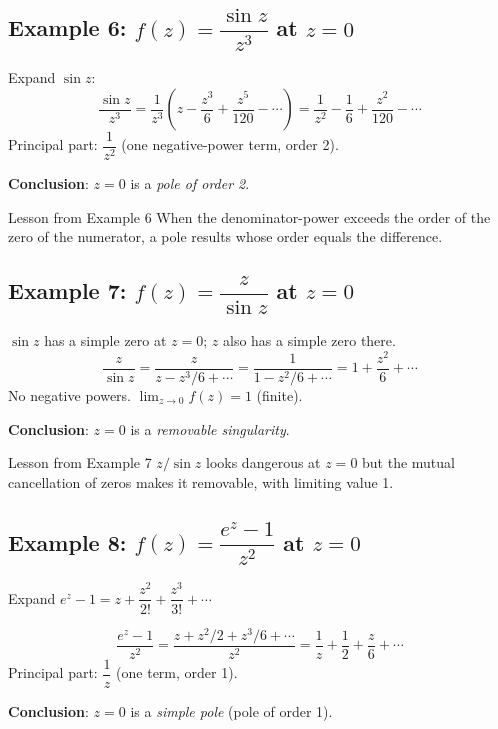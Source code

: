 \documentclass[12pt,a4paper]{article}
\begin{document}
\subsection*{Example 6: $f(z) = \dfrac{\sin z}{z^3}$ at $z = 0$}

Expand $\sin z$:
\[
  \frac{\sin z}{z^3} = \frac{1}{z^3}\!\left(z - \frac{z^3}{6} + \frac{z^5}{120} - \cdots\right)
  = \frac{1}{z^2} - \frac{1}{6} + \frac{z^2}{120} - \cdots
\]
Principal part: $\dfrac{1}{z^2}$ (one negative-power term, order 2).

\textbf{Conclusion}: $z = 0$ is a \emph{pole of order 2}.

\begin{learnbox}{Lesson from Example 6}
When the denominator-power exceeds the order of the zero of the numerator, a pole results whose
order equals the difference.
\end{learnbox}

\subsection*{Example 7: $f(z) = \dfrac{z}{\sin z}$ at $z = 0$}

$\sin z$ has a simple zero at $z = 0$; $z$ also has a simple zero there.
\[
  \frac{z}{\sin z} = \frac{z}{z - z^3/6 + \cdots} = \frac{1}{1 - z^2/6 + \cdots}
  = 1 + \frac{z^2}{6} + \cdots
\]
No negative powers.
$\lim_{z\to 0} f(z) = 1$ (finite).

\textbf{Conclusion}: $z = 0$ is a \emph{removable singularity}.

\begin{learnbox}{Lesson from Example 7}
$z / \sin z$ looks dangerous at $z = 0$ but the mutual cancellation of zeros makes it removable,
with limiting value 1.
\end{learnbox}

\subsection*{Example 8: $f(z) = \dfrac{e^z - 1}{z^2}$ at $z = 0$}

Expand $e^z - 1 = z + \dfrac{z^2}{2!} + \dfrac{z^3}{3!} + \cdots$

\[
  \frac{e^z - 1}{z^2} = \frac{z + z^2/2 + z^3/6 + \cdots}{z^2}
  = \frac{1}{z} + \frac{1}{2} + \frac{z}{6} + \cdots
\]
Principal part: $\dfrac{1}{z}$ (one term, order 1).

\textbf{Conclusion}: $z = 0$ is a \emph{simple pole} (pole of order 1).
\end{document}
